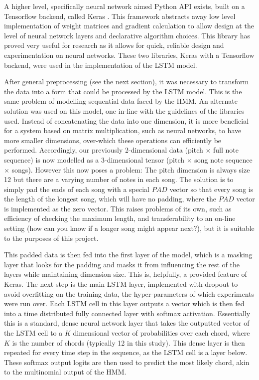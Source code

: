 \documentclass[bsc,singlespacing,logo, parskip, deptreport]{infthesis}
\begin{document}
A higher level, specifically neural network aimed Python API exists, built on a Tensorflow backend, called Keras \cite{chollet2015}. This framework abstracts away low level implementation of weight matrices and gradient calculation to allow design at the level of neural network layers and declarative algorithm choices. This library has proved very useful for research as it allows for quick, reliable design and experimentation on neural networks. These two libraries, Keras with a Tensorflow backend, were used in the implementation of the LSTM model.

After general preprocessing (see the next section), it was necessary to transform the data into a form that could be processed by the LSTM model. This is the same problem of modelling sequential data faced by the HMM. An alternate solution was used on this model, one in-line with the guidelines of the libraries used. Instead of concatenating the data into one dimension, it is more beneficial for a system based on matrix multiplication, such as neural networks, to have more smaller dimensions, over-which these operations can efficiently be performed. Accordingly, our previously 2-dimensional data (pitch $\times$ full note sequence) is now modelled as a 3-dimensional tensor (pitch $\times$ song note sequence $\times$ songs). However this now poses a problem: The pitch dimension is always size 12 but there are a varying number of notes in each song. The solution is to simply pad the ends of each song with a special $PAD$ vector so that every song is the length of the longest song, which will have no padding, where the $PAD$ vector is implemented as the zero vector. This raises problems of its own, such as efficiency of checking the maximum length, and transferability to an on-line setting (how can you know if a longer song might appear next?), but it is suitable to the purposes of this project.

This padded data is then fed into the first layer of the model, which is a masking layer that looks for the padding and masks it from influencing the rest of the layers while maintaining dimension size. This is, helpfully, a provided feature of Keras. The next step is the main LSTM layer, implemented with dropout to avoid overfitting on the training data, the hyper-parameters of which experiments were run over. Each LSTM cell in this layer outputs a vector which is then fed into a time distributed fully connected layer with softmax activation. Essentially this is a standard, dense neural network layer that takes the outputted vector of the LSTM cell to a $K$ dimensional vector of probabilities over each chord, where $K$ is the number of chords (typically 12 in this study). This dense layer is then repeated for every time step in the sequence, as the LSTM cell is a layer below. These softmax output logits are then used to predict the most likely chord, akin to the multinomial output of the HMM.
\end{document}
